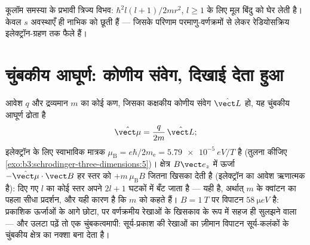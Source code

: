\begin{omfigure}

{\small कूलॉम समस्या के प्रभावी त्रिज्य विभव:
 $\hbar^2l(l+1)/2mr^2$, $l \ge 1$ के लिए मूल बिंदु को
घेर लेती है। केवल $s$ अवस्थाएँ ही नाभिक को छूती हैं --- जिसके परिणाम
परमाणु-वर्णक्रमों से लेकर रेडियोसक्रिय इलेक्ट्रॉन-ग्रहण तक फैले हैं।}
\end{omfigure}

\section{चुंबकीय आघूर्ण: कोणीय संवेग, दिखाई देता हुआ}

\begin{proposition}[कक्षकीय चुंबकीय आघूर्ण और ज़ीमान प्रभाव]\label{prop:b3:quantum-angular-momentum:magnetic}
आवेश $q$ और द्रव्यमान $m$ का कोई कण, जिसका कक्षकीय कोणीय संवेग
$\hat{\vect L}$ हो, यह चुंबकीय आघूर्ण ढोता है
\[
\hat{\vect\mu} = \frac{q}{2m}\,\hat{\vect L} ;
\]
इलेक्ट्रॉन के लिए स्वाभाविक मात्रक \emph{}
$\mu_{\text{B}} = e\hbar/2m_{\text{e}} = \qty{5.79e-5}{eV/T}$ है
(तुलना कीजिए \cref{exo:b3:schrodinger-three-dimensions:5})। क्षेत्र
$B\vect e_z$ में ऊर्जा $-\hat{\vect\mu}\cdot\vect B$ हर स्तर को
$+m\,\mu_{\text{B}}B$ जितना खिसका देती है (इलेक्ट्रॉन का आवेश ऋणात्मक
है): दिए गए $l$ का कोई स्तर अपने $2l + 1$ घटकों में बँट जाता है ---
यही \emph{} है, अर्थात् $m$ के क्वांटन का पहला सीधा
प्रदर्शन, और यही कारण है कि $m$ को  कहते हैं।
$B = \qty{1}{T}$ पर विपाटन $\qty{58}{\micro eV}$ है: प्रकाशिक
ऊर्जाओं के आगे छोटा, पर वर्णक्रमीय रेखाओं के खिसकाव के रूप में सहज ही
सुलझने वाला --- और उलटा पढ़ें तो एक चुंबकत्वमापी: सूर्य-प्रकाश की
रेखाओं का ज़ीमान विपाटन सूर्य-कलंकों के चुंबकीय क्षेत्र का नक्शा बना देता है।
\end{proposition}

